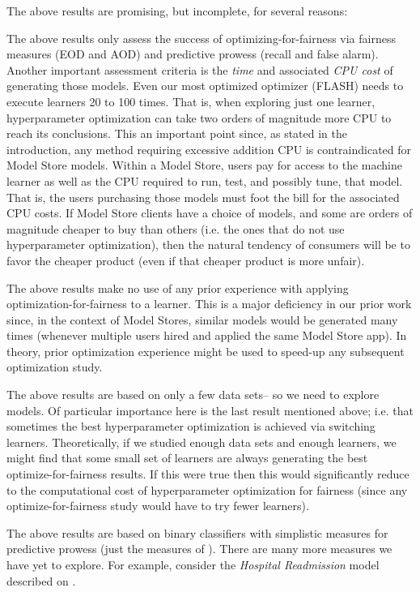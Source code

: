 \noindent
The above results are promising, but incomplete, for several reasons:
\bi
\item
The above results only assess the success
of optimizing-for-fairness via fairness measures (EOD and AOD) and predictive prowess (recall
and false alarm). Another important assessment criteria is the 
{\em time} and associated  {\em CPU cost} of generating those models. 
Even our most optimized optimizer (FLASH) needs to execute learners 20 to 100 times.
That is, when exploring just one learner, hyperparameter optimization can take two
orders of magnitude more CPU to reach its conclusions.
This an important point since,
as stated in the introduction, 
any method requiring excessive addition CPU is contraindicated for Model Store models.
Within a Model Store, users pay for access to the machine learner
as well as the CPU required to run, test, and possibly tune, that model.
That is, the users
purchasing those models must foot the bill for the associated CPU costs.
If Model Store clients have a choice of models, and some are orders of magnitude cheaper to buy than others
(i.e. the ones that do not use hyperparameter optimization), then the natural tendency of consumers
will be to favor the cheaper product (even if that cheaper product is more unfair).
\item
The  above results make no use of any prior experience with 
applying   optimization-for-fairness to a learner. This is a major deficiency in our prior work since,
in the context of Model Stores, similar models would be generated many times (whenever multiple
users hired and applied the same Model Store app). In theory, prior optimization
experience might be used to speed-up any subsequent optimization study.  
\item
The above results are based on only a few data sets--
so we need to explore models.
Of particular importance here is the
last result mentioned above; i.e. that sometimes the best hyperparameter optimization
is achieved via switching learners.  Theoretically, if we studied enough data sets and enough learners, we might find that some small set of learners are always
generating the best optimize-for-fairness results. If this were true then this would significantly reduce to the computational cost of hyperparameter optimization for fairness (since any optimize-for-fairness study would have to try  fewer   learners). 
\item
The above results
are based on binary classifiers with simplistic measures for predictive prowess
(just the measures of ). There are many more measures we have yet to explore. For example, consider the {\em Hospital  Readmission} model described on . 
